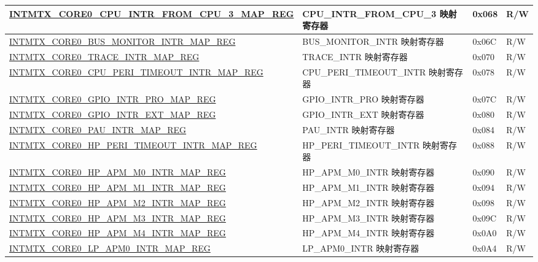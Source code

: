 \begin{longtable}{ | p{10cm} | p{10cm} | p{1.3cm} | p{1cm} | }
\hyperref[regdesc:INTMTXCORE0CPUINTRFROMCPU3MAPREG]{INTMTX\_CORE0\_CPU\_INTR\_FROM\_CPU\_3\_MAP\_REG} & CPU\_INTR\_FROM\_CPU\_3 映射寄存器 & 0x068 & R/W  \\ \hline
\hyperref[regdesc:INTMTXCORE0BUSMONITORINTRMAPREG]{INTMTX\_CORE0\_BUS\_MONITOR\_INTR\_MAP\_REG} & BUS\_MONITOR\_INTR 映射寄存器 & 0x06C & R/W  \\ \hline
\hyperref[regdesc:INTMTXCORE0TRACEINTRMAPREG]{INTMTX\_CORE0\_TRACE\_INTR\_MAP\_REG} & TRACE\_INTR 映射寄存器 & 0x070 & R/W  \\ \hline
\hyperref[regdesc:INTMTXCORE0CPUPERITIMEOUTINTRMAPREG]{INTMTX\_CORE0\_CPU\_PERI\_TIMEOUT\_INTR\_MAP\_REG} & CPU\_PERI\_TIMEOUT\_INTR 映射寄存器 & 0x078 & R/W  \\ \hline
\hyperref[regdesc:INTMTXCORE0GPIOINTRPROMAPREG]{INTMTX\_CORE0\_GPIO\_INTR\_PRO\_MAP\_REG} & GPIO\_INTR\_PRO 映射寄存器 & 0x07C & R/W  \\ \hline
\hyperref[regdesc:INTMTXCORE0GPIOINTREXTMAPREG]{INTMTX\_CORE0\_GPIO\_INTR\_EXT\_MAP\_REG} & GPIO\_INTR\_EXT 映射寄存器 & 0x080 & R/W  \\ \hline
\hyperref[regdesc:INTMTXCORE0PAUINTRMAPREG]{INTMTX\_CORE0\_PAU\_INTR\_MAP\_REG} & PAU\_INTR 映射寄存器 & 0x084 & R/W  \\ \hline
\hyperref[regdesc:INTMTXCORE0HPPERITIMEOUTINTRMAPREG]{INTMTX\_CORE0\_HP\_PERI\_TIMEOUT\_INTR\_MAP\_REG} & HP\_PERI\_TIMEOUT\_INTR 映射寄存器 & 0x088 & R/W  \\ \hline
\hyperref[regdesc:INTMTXCORE0HPAPMM0INTRMAPREG]{INTMTX\_CORE0\_HP\_APM\_M0\_INTR\_MAP\_REG} & HP\_APM\_M0\_INTR 映射寄存器 & 0x090 & R/W  \\ \hline
\hyperref[regdesc:INTMTXCORE0HPAPMM1INTRMAPREG]{INTMTX\_CORE0\_HP\_APM\_M1\_INTR\_MAP\_REG} & HP\_APM\_M1\_INTR 映射寄存器 & 0x094 & R/W  \\ \hline
\hyperref[regdesc:INTMTXCORE0HPAPMM2INTRMAPREG]{INTMTX\_CORE0\_HP\_APM\_M2\_INTR\_MAP\_REG} & HP\_APM\_M2\_INTR 映射寄存器 & 0x098 & R/W  \\ \hline
\hyperref[regdesc:INTMTXCORE0HPAPMM3INTRMAPREG]{INTMTX\_CORE0\_HP\_APM\_M3\_INTR\_MAP\_REG} & HP\_APM\_M3\_INTR 映射寄存器 & 0x09C & R/W  \\ \hline
\hyperref[regdesc:INTMTXCORE0HPAPMM4INTRMAPREG]{INTMTX\_CORE0\_HP\_APM\_M4\_INTR\_MAP\_REG} & HP\_APM\_M4\_INTR 映射寄存器 & 0x0A0 & R/W  \\ \hline
\hyperref[regdesc:INTMTXCORE0LPAPM0INTRMAPREG]{INTMTX\_CORE0\_LP\_APM0\_INTR\_MAP\_REG} & LP\_APM0\_INTR 映射寄存器 & 0x0A4 & R/W  \\ \hline

\end{longtable}
